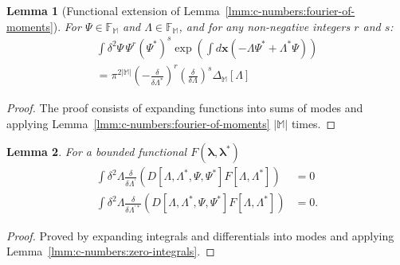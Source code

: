 \documentclass[12pt,aip,jmp,amssymb,amsmath]{revtex4-1}
\newcommand{\xvec}{\boldsymbol{x}}
\newcommand{\blambda}{\boldsymbol{\lambda}}
\newcommand{\restbasis}{\mathbb{M}}
\newcommand{\lmmref}[1]{Lemma~\ref{lmm:#1}}
\newtheorem{lemma}{Lemma}
\begin{document}
\begin{lemma}[Functional extension of \lmmref{c-numbers:fourier-of-moments}]
\label{lmm:func-calculus:fourier-of-moments}
    For $\Psi \in \mathbb{F}_{\restbasis}$ and $\Lambda \in \mathbb{F}_{\restbasis}$, and for any non-negative integers $r$ and $s$:
    \begin{equation*}\begin{split}
        \int \delta^2\Psi\, \Psi^r (\Psi^*)^s \exp \left(
                \int d\xvec \left( -\Lambda \Psi^* + \Lambda^* \Psi \right)
            \right) \\
        = \pi^{2|\restbasis|}
            \left( -\frac{\delta}{\delta \Lambda^*} \right)^r
            \left( \frac{\delta}{\delta \Lambda} \right)^s
            \Delta_{\restbasis}[\Lambda]
    \end{split}\end{equation*}
\end{lemma}
\begin{proof}
The proof consists of expanding functions into sums of modes and applying \lmmref{c-numbers:fourier-of-moments} $|\restbasis|$ times.
\end{proof}

\begin{lemma}
\label{lmm:func-calculus:zero-integrals}
    For a bounded functional $F(\blambda, \blambda^*)$
    \begin{equation*}\begin{split}
        \int \delta^2\Lambda
            \frac{\delta}{\delta \Lambda^\prime} \left(
                D[\Lambda, \Lambda^*, \Psi, \Psi^*]
                F[\Lambda, \Lambda^*]
            \right)
        & = 0 \\
        \int \delta^2\Lambda
            \frac{\delta}{\delta \Lambda^{\prime*}}
            \left(
                D[\Lambda, \Lambda^*, \Psi, \Psi^*]
                F[\Lambda, \Lambda^*]
            \right)
        & = 0.
    \end{split}\end{equation*}
\end{lemma}
\begin{proof}
Proved by expanding integrals and differentials into modes and applying \lmmref{c-numbers:zero-integrals}.
\end{proof}
\end{document}

